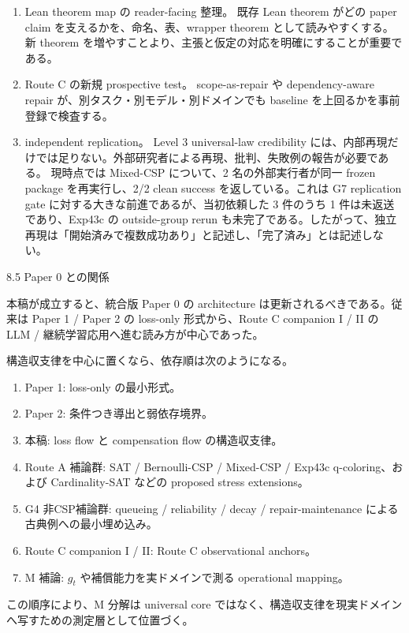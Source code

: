\documentclass[12pt,a4paper]{article}
\begin{document}
\begin{enumerate}
\item
  Lean theorem map の reader-facing 整理。 既存 Lean theorem がどの paper claim を支えるかを、命名、表、wrapper theorem として読みやすくする。新 theorem を増やすことより、主張と仮定の対応を明確にすることが重要である。
\item
  Route C の新規 prospective test。 scope-as-repair や dependency-aware repair が、別タスク・別モデル・別ドメインでも baseline を上回るかを事前登録で検査する。
\item
  independent replication。 Level 3 universal-law credibility には、内部再現だけでは足りない。外部研究者による再現、批判、失敗例の報告が必要である。 現時点では Mixed-CSP について、2 名の外部実行者が同一 frozen package を再実行し、2/2 clean success を返している。これは G7 replication gate に対する大きな前進であるが、当初依頼した 3 件のうち 1 件は未返送であり、Exp43c の outside-group rerun も未完了である。したがって、独立再現は「開始済みで複数成功あり」と記述し、「完了済み」とは記述しない。
\end{enumerate}

8.5 Paper 0 との関係

本稿が成立すると、統合版 Paper 0 の architecture は更新されるべきである。従来は Paper 1 / Paper 2 の loss-only 形式から、Route C companion I / II の LLM / 継続学習応用へ進む読み方が中心であった。

構造収支律を中心に置くなら、依存順は次のようになる。

\begin{enumerate}
\def\labelenumi{\arabic{enumi}.}
\tightlist
\item
  Paper 1: loss-only の最小形式。
\item
  Paper 2: 条件つき導出と弱依存境界。
\item
  本稿: loss flow と compensation flow の構造収支律。
\item
  Route A 補論群: SAT / Bernoulli-CSP / Mixed-CSP / Exp43c q-coloring、および Cardinality-SAT などの proposed stress extensions。
\item
  G4 非CSP補論群: queueing / reliability / decay / repair-maintenance による古典例への最小埋め込み。
\item
  Route C companion I / II: Route C observational anchors。
\item
  M 補論: \(g_{t}\) や補償能力を実ドメインで測る operational mapping。
\end{enumerate}

この順序により、M 分解は universal core ではなく、構造収支律を現実ドメインへ写すための測定層として位置づく。
\end{document}
